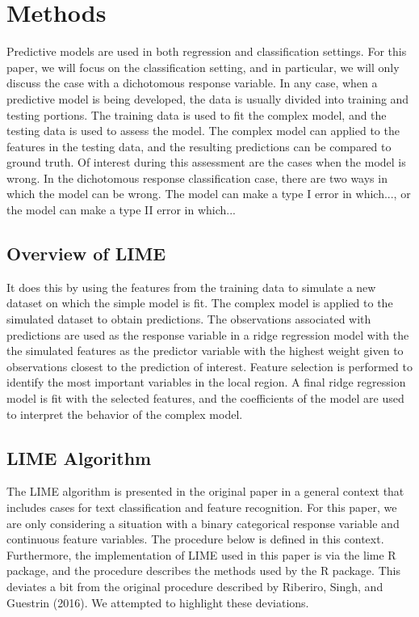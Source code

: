 \documentclass[AMS,STIX2COL]{WileyNJD-v2}
\begin{document}
\section{Methods}

Predictive models are used in both regression and classification settings. For this paper, we will focus on the classification setting, and in particular, we will only discuss the case with a dichotomous response variable. In any case, when a predictive model is being developed, the data is usually divided into training and testing portions. The training data is used to fit the complex model, and the testing data is used to assess the model. The complex model can applied to the features in the testing data, and the resulting predictions can be compared to ground truth. Of interest during this assessment are the cases when the model is wrong. In the dichotomous response classification case, there are two ways in which the model can be wrong. The model can make a type I error in which..., or the model can make a type II error in which...

\subsection{Overview of LIME}

It does this by using the features from the training data to simulate a new dataset on which the simple model is fit. The complex model is applied to the simulated dataset to obtain predictions. The observations associated with predictions are used as the response variable in a ridge regression model with the the simulated features as the predictor variable with the highest weight given to observations closest to the prediction of interest. Feature selection is performed to identify the most important variables in the local region. A final ridge regression model is fit with the selected features, and the coefficients of the model are used to interpret the behavior of the complex model.

\subsection{LIME Algorithm}

The LIME algorithm is presented in the original paper in a general context that includes cases for text classification and feature recognition. For this paper, we are only considering a situation with a binary categorical response variable and continuous feature variables. The procedure below is defined in this context. Furthermore, the implementation of LIME used in this paper is via the lime R package, and the procedure describes the methods used by the R package. This deviates a bit from the original procedure described by Riberiro, Singh, and Guestrin (2016). We attempted to highlight these deviations.
\end{document}
